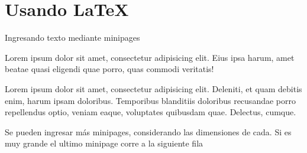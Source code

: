\documentclass[10pt]{beamer}%
\begin{document}
\section{Usando \LaTeX} %
\begin{frame}{Ingresando texto mediante minipages}
	\begin{minipage}{0.48\textwidth}
			Lorem ipsum dolor sit amet, consectetur adipisicing elit. Eius ipsa harum, amet beatae quasi eligendi quae porro, quas commodi veritatis!
	\end{minipage}
	\hfill
	\begin{minipage}{0.48\textwidth}
			Lorem ipsum dolor sit amet, consectetur adipisicing elit. Deleniti, et quam debitis enim, harum ipsam doloribus. Temporibus blanditiis doloribus recusandae porro repellendus optio, veniam eaque, voluptates quibusdam quae. Delectus, cumque.
	\end{minipage}

	\vspace{0.5cm}

	Se pueden ingresar más minipages, considerando las dimensiones de cada. Si es muy grande el ultimo minipage corre a la siguiente fila
\end{frame}
\end{document}
